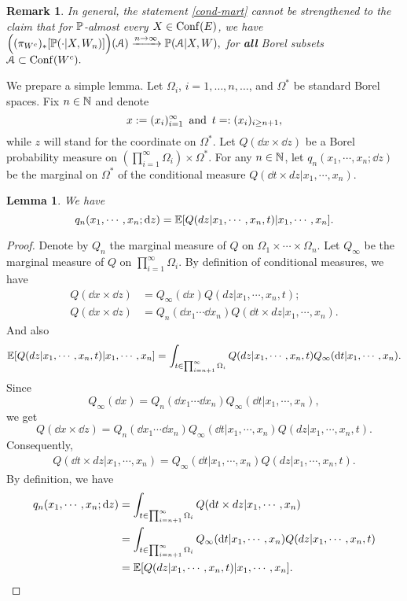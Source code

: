\documentclass[12pt]{paper}
\newtheorem{lemma}[theorem]{Lemma}
\newtheorem*{remark*}{Remark}
\numberwithin{theorem}{section}
\numberwithin{figure}{section}
\numberwithin{equation}{section}
\begin{document}
\begin{remark*}
In general,  the statement \eqref{cond-mart}  cannot be strengthened to the claim that for $\mathbb{P}$-almost every $X\in \mathrm{Conf}(E)$, we have
$
\Big((\pi_{W^c})_{*}[\mathbb{P}(\cdot |X,  W_n)] \Big)  (\mathcal{A})  \xrightarrow{n\to\infty} \mathbb{P} (\mathcal{A}| X, W),$
for {\bf all} Borel subsets $\mathcal{A} \subset \mathrm{Conf}(W^c).$

\end{remark*}








We prepare a simple lemma.
Let $\Omega_i$, $i=1, \dots, n, \dots$, and $\Omega^*$ be standard Borel spaces.
Fix $n\in\mathbb{N}$ and denote
\[
x: = (x_i)_{i=1}^\infty \text{\, and \,} t =: (x_i)_{i\ge n+1},
\]
while $z$ will stand for the coordinate on $\Omega^*$.
Let $Q(\dd x\times \dd z)$ be a Borel probability measure on $(\prod_{i=1}^\infty \Omega_i ) \times \Omega^{*}$.  For any $n\in\mathbb{N}$, let $q_n(x_1, \cdots, x_n; \dd z)$ be the marginal on $\Omega^*$ of the conditional measure $Q(\dd t \times  dz| x_1, \cdots, x_n)$.
\begin{lemma}\label{lem-meas-mart} We have
\[
q_n(x_1, \cdots, x_n; \mathrm{d} z) = \mathbb{E}[Q(dz| x_1, \cdots, x_n, t) | x_1, \cdots, x_n].
\]
\end{lemma}
\begin{proof}
 Denote by $Q_n$ the marginal measure of $Q$ on $\Omega_1 \times \cdots \times \Omega_n$. Let $Q_\infty$ be  the marginal measure of $Q$ on $\prod_{i=1}^\infty \Omega_i $.
 By definition of conditional measures, we have
\begin{align*}
Q(\dd x  \times \dd z)& =Q_\infty( \dd x) Q(dz| x_1, \cdots, x_n, t);
\\
Q(\dd x  \times \dd z)& =   Q_{n} (\dd x_1 \cdots \dd x_n)  Q(\dd t \times  dz| x_1, \cdots, x_n).
\end{align*}
And also
\begin{align*}
 \mathbb{E}[Q(dz| x_1, \cdots, x_n, t) | x_1, \cdots, x_n] =  \int_{ t \in \prod_{i=n+1}^\infty \Omega_i}   Q(dz| x_1, \cdots, x_n, t)  Q_\infty(\mathrm{d} t  | x_1, \cdots,  x_n).
\end{align*}
Since
\[
Q_\infty( \dd x )  = Q_{n} (\dd x_1 \cdots \dd x_n)  Q_\infty(\dd t  | x_1, \cdots,  x_n),
\]
we get
\[
Q(\dd x \times \dd z) =  Q_{n} (\dd x_1 \cdots \dd x_n)  Q_\infty(\dd t  | x_1, \cdots,  x_n)  Q(dz| x_1, \cdots, x_n, t).
\]
Consequently,
\begin{align*}
Q(\dd t \times  dz| x_1, \cdots, x_n) =  Q_\infty(\dd t  | x_1, \cdots,  x_n)  Q(dz| x_1, \cdots, x_n, t).
\end{align*}
By definition, we have
\begin{align*}
q_n(x_1, \cdots, x_n; \mathrm{d} z) &= \int_{t \in \prod_{i=n+1}^\infty \Omega_i} Q(\mathrm{d} t \times  dz| x_1, \cdots, x_n)
\\
& = \int_{t\in \prod_{i=n+1}^\infty \Omega_i} Q_\infty(\mathrm{d} t | x_1, \cdots,  x_n)  Q(dz| x_1, \cdots, x_n, t )
\\
&   =  \mathbb{E}[Q(dz| x_1, \cdots, x_n, t) | x_1, \cdots, x_n].
\end{align*}
\end{proof}
\end{document}
